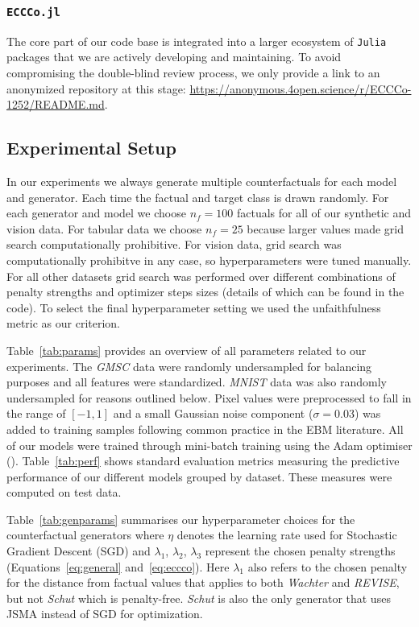 \subsubsection{\texttt{ECCCo.jl}}

The core part of our code base is integrated into a larger ecosystem of \texttt{Julia} packages that we are actively developing and maintaining. To avoid compromising the double-blind review process, we only provide a link to an anonymized repository at this stage: \url{https://anonymous.4open.science/r/ECCCo-1252/README.md}. 

\subsection{Experimental Setup}\label{app:setup}

In our experiments we always generate multiple counterfactuals for each model and generator. Each time the factual and target class is drawn randomly. For each generator and model we choose $n_f=100$ factuals for all of our synthetic and vision data. For tabular data we choose $n_f=25$ because larger values made grid search computationally prohibitive. For vision data, grid search was computationally prohibitve in any case, so hyperparameters were tuned manually. For all other datasets grid search was performed over different combinations of penalty strengths and optimizer steps sizes (details of which can be found in the code). To select the final hyperparameter setting we used the unfaithfulness metric as our criterion.

Table~\ref{tab:params} provides an overview of all parameters related to our experiments. The \textit{GMSC} data were randomly undersampled for balancing purposes and all features were standardized. \textit{MNIST} data was also randomly undersampled for reasons outlined below. Pixel values were preprocessed to fall in the range of $[-1,1]$ and a small Gaussian noise component ($\sigma=0.03$) was added to training samples following common practice in the EBM literature. All of our models were trained through mini-batch training using the Adam optimiser (\citet{kingma2014adam}). Table~\ref{tab:perf} shows standard evaluation metrics measuring the predictive performance of our different models grouped by dataset. These measures were computed on test data. 

Table~\ref{tab:genparams} summarises our hyperparameter choices for the counterfactual generators where $\eta$ denotes the learning rate used for Stochastic Gradient Descent (SGD) and $\lambda_1$, $\lambda_2$, $\lambda_3$ represent the chosen penalty strengths (Equations~\ref{eq:general} and~\ref{eq:eccco}). Here $\lambda_1$ also refers to the chosen penalty for the distance from factual values that applies to both \textit{Wachter} and \textit{REVISE}, but not \textit{Schut} which is penalty-free. \textit{Schut} is also the only generator that uses JSMA instead of SGD for optimization.

